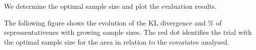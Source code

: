 \documentclass[
]{book}
\newenvironment{Shaded}{\begin{snugshade}}{\end{snugshade}}
\newcommand{\CommentTok}[1]{\textcolor[rgb]{0.56,0.35,0.01}{\textit{#1}}}
\newcommand{\FunctionTok}[1]{\textcolor[rgb]{0.00,0.00,0.00}{#1}}
\newcommand{\NormalTok}[1]{#1}
\newcommand{\OtherTok}[1]{\textcolor[rgb]{0.56,0.35,0.01}{#1}}
\newcommand{\SpecialCharTok}[1]{\textcolor[rgb]{0.00,0.00,0.00}{#1}}
\begin{document}
We determine the optimal sample size and plot the evaluation results.

The following figure shows the evolution of the KL divergence and \% of repressentativenes with growing sample sizes. The red dot identifies the trial with the optimal sample size for the area in relation to the covariates analysed.

\begin{Shaded}
\end{Shaded}
\end{document}
